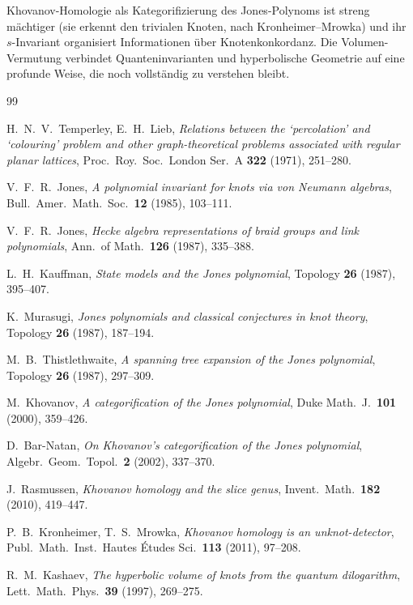 \documentclass[12pt,a4paper]{amsart}
\theoremstyle{definition}
\theoremstyle{remark}
\begin{document}
Khovanov-Homologie als Kategorifizierung des Jones-Polynoms ist streng
mächtiger (sie erkennt den trivialen Knoten, nach Kronheimer--Mrowka) und
ihr $s$-Invariant organisiert Informationen über Knotenkonkordanz. Die
Volumen-Vermutung verbindet Quanteninvarianten und hyperbolische Geometrie
auf eine profunde Weise, die noch vollständig zu verstehen bleibt.

\begin{thebibliography}{99}

H.~N.~V.~Temperley, E.~H.~Lieb,
\textit{Relations between the `percolation' and `colouring' problem and
other graph-theoretical problems associated with regular planar lattices},
Proc.\ Roy.\ Soc.\ London Ser.\ A \textbf{322} (1971), 251--280.

V.~F.~R.~Jones,
\textit{A polynomial invariant for knots via von Neumann algebras},
Bull.\ Amer.\ Math.\ Soc.\ \textbf{12} (1985), 103--111.

V.~F.~R.~Jones,
\textit{Hecke algebra representations of braid groups and link polynomials},
Ann.\ of Math.\ \textbf{126} (1987), 335--388.

L.~H.~Kauffman,
\textit{State models and the Jones polynomial},
Topology \textbf{26} (1987), 395--407.

K.~Murasugi,
\textit{Jones polynomials and classical conjectures in knot theory},
Topology \textbf{26} (1987), 187--194.

M.~B.~Thistlethwaite,
\textit{A spanning tree expansion of the Jones polynomial},
Topology \textbf{26} (1987), 297--309.

M.~Khovanov,
\textit{A categorification of the Jones polynomial},
Duke Math.\ J.\ \textbf{101} (2000), 359--426.

D.~Bar-Natan,
\textit{On Khovanov's categorification of the Jones polynomial},
Algebr.\ Geom.\ Topol.\ \textbf{2} (2002), 337--370.

J.~Rasmussen,
\textit{Khovanov homology and the slice genus},
Invent.\ Math.\ \textbf{182} (2010), 419--447.

P.~B.~Kronheimer, T.~S.~Mrowka,
\textit{Khovanov homology is an unknot-detector},
Publ.\ Math.\ Inst.\ Hautes Études Sci.\ \textbf{113} (2011), 97--208.

R.~M.~Kashaev,
\textit{The hyperbolic volume of knots from the quantum dilogarithm},
Lett.\ Math.\ Phys.\ \textbf{39} (1997), 269--275.


\end{thebibliography}
\end{document}
